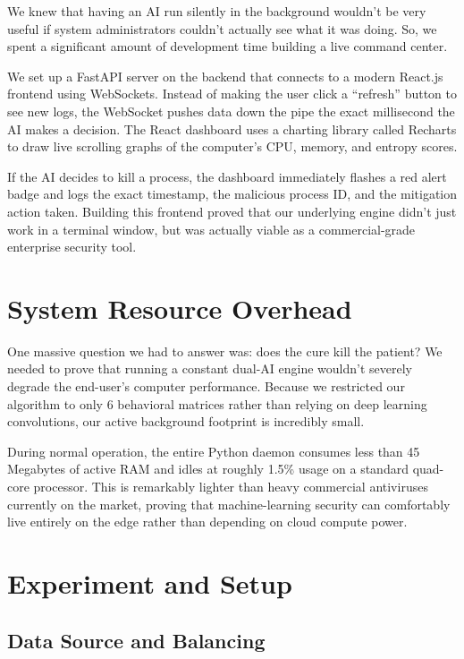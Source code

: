 \documentclass[conference]{IEEEtran}
\begin{document}
We knew that having an AI run silently in the background wouldn't be very useful if system administrators couldn't actually see what it was doing. So, we spent a significant amount of development time building a live command center. 

We set up a FastAPI server on the backend that connects to a modern React.js frontend using WebSockets. Instead of making the user click a ``refresh'' button to see new logs, the WebSocket pushes data down the pipe the exact millisecond the AI makes a decision. The React dashboard uses a charting library called Recharts to draw live scrolling graphs of the computer's CPU, memory, and entropy scores. 

If the AI decides to kill a process, the dashboard immediately flashes a red alert badge and logs the exact timestamp, the malicious process ID, and the mitigation action taken. Building this frontend proved that our underlying engine didn't just work in a terminal window, but was actually viable as a commercial-grade enterprise security tool.

\section{System Resource Overhead}

One massive question we had to answer was: does the cure kill the patient? We needed to prove that running a constant dual-AI engine wouldn't severely degrade the end-user's computer performance. Because we restricted our algorithm to only 6 behavioral matrices rather than relying on deep learning convolutions, our active background footprint is incredibly small.

During normal operation, the entire Python daemon consumes less than 45 Megabytes of active RAM and idles at roughly 1.5\% usage on a standard quad-core processor. This is remarkably lighter than heavy commercial antiviruses currently on the market, proving that machine-learning security can comfortably live entirely on the edge rather than depending on cloud compute power.

\section{Experiment and Setup}

\subsection{Data Source and Balancing}
\end{document}
